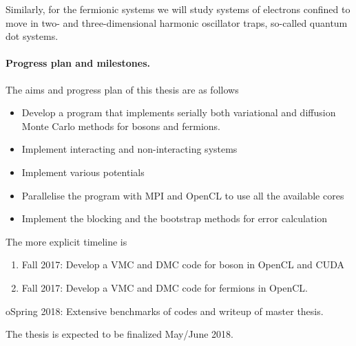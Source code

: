 \documentclass[%
oneside,                 %
final,                   %
10pt]{article}
\begin{document}
Similarly, for the fermionic systems we will study systems of electrons confined to move in two- and three-dimensional harmonic oscillator traps, so-called quantum dot systems.


\paragraph{Progress plan and milestones.}
The aims and progress plan of this thesis are as follows

\begin{itemize}
\item Develop a program that implements serially both variational and diffusion Monte Carlo methods for bosons and fermions.

\item Implement interacting and non-interacting systems

\item Implement various potentials

\item Parallelise the program with MPI and OpenCL to use all the available cores

\item Implement the blocking and the bootstrap methods  for error calculation
\end{itemize}

\noindent
The more explicit timeline is 

\begin{enumerate}
 \item Fall 2017: Develop a VMC and DMC code for boson in OpenCL and CUDA

 \item Fall 2017: Develop a VMC and DMC  code for fermions in OpenCL.
\end{enumerate}

\noindent
 oSpring 2018: Extensive benchmarks of codes and writeup of master thesis.


The thesis is expected to be finalized May/June 2018.

















\end{document}
